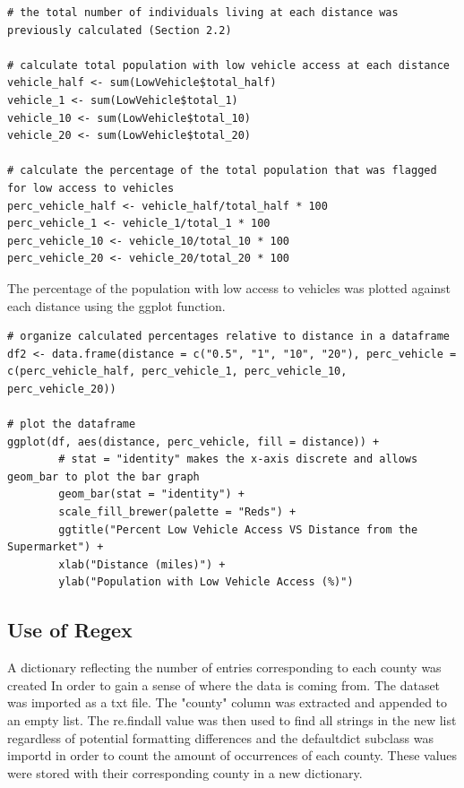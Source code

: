 \documentclass[letterpaper]{article} %
\begin{document}
\lstset{language=R}
\begin{lstlisting}[frame=single] 
# the total number of individuals living at each distance was previously calculated (Section 2.2)

# calculate total population with low vehicle access at each distance
vehicle_half <- sum(LowVehicle$total_half)
vehicle_1 <- sum(LowVehicle$total_1)
vehicle_10 <- sum(LowVehicle$total_10)
vehicle_20 <- sum(LowVehicle$total_20)

# calculate the percentage of the total population that was flagged for low access to vehicles
perc_vehicle_half <- vehicle_half/total_half * 100
perc_vehicle_1 <- vehicle_1/total_1 * 100
perc_vehicle_10 <- vehicle_10/total_10 * 100
perc_vehicle_20 <- vehicle_20/total_20 * 100

\end{lstlisting}

The percentage of the population with low access to vehicles was plotted against each distance using the ggplot function. 

\lstset{language=R}
\begin{lstlisting}[frame=single]
# organize calculated percentages relative to distance in a dataframe
df2 <- data.frame(distance = c("0.5", "1", "10", "20"), perc_vehicle = c(perc_vehicle_half, perc_vehicle_1, perc_vehicle_10, perc_vehicle_20))

# plot the dataframe 
ggplot(df, aes(distance, perc_vehicle, fill = distance)) + 
        # stat = "identity" makes the x-axis discrete and allows geom_bar to plot the bar graph
        geom_bar(stat = "identity") + 
        scale_fill_brewer(palette = "Reds") +
        ggtitle("Percent Low Vehicle Access VS Distance from the Supermarket") +
        xlab("Distance (miles)") +
        ylab("Population with Low Vehicle Access (%)")

\end{lstlisting}

\subsection{Use of Regex}

A dictionary reflecting the number of entries corresponding to each county was created In order to gain a sense of where the data is coming from. The dataset was imported as a txt file. The "county" column was extracted and appended to an empty list. The re.findall value was then used to find all strings in the new list regardless of potential formatting differences and the defaultdict subclass was importd in order to count the amount of occurrences of each county. These values were stored with their corresponding county in a new dictionary. 
\end{document}
